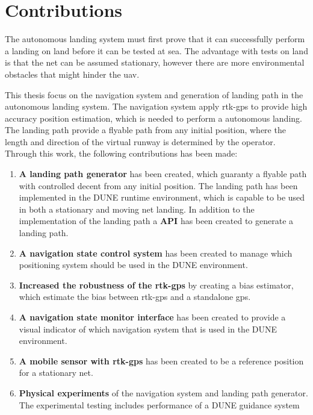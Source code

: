 \section{Contributions}
The autonomous landing system must first prove that it can successfully perform a landing on land before it can be tested at sea. The advantage with tests on land is that the net can be assumed stationary, however there are more environmental obstacles that might hinder the \gls{uav}.

This thesis focus on the navigation system and generation of landing path in the autonomous landing system. The navigation system apply \gls{rtk-gps} to provide high accuracy position estimation, which is needed to perform a autonomous landing. The landing path provide a flyable path from any initial position, where the length and direction of the virtual runway is determined by the operator. Through this work, the following contributions has been made:
\begin{enumerate}
\item \textbf{A landing path generator} has been created, which guaranty a flyable path with controlled decent from any initial position. The landing path has been implemented in the DUNE runtime environment, which is capable to be used in both a stationary and moving net landing. In addition to the implementation of the landing path a \textbf{API} has been created to generate a landing path.
\item \textbf{A navigation state control system} has been created to manage which positioning system should be used in the DUNE environment.
\item \textbf{Increased the robustness of the \gls{rtk-gps}} by creating a bias estimator, which estimate the bias between \gls{rtk-gps} and a standalone \gls{gps}.
\item \textbf{A navigation state monitor interface} has been created to provide a visual indicator of which navigation system that is used in the DUNE environment.
\item \textbf{A mobile sensor with \gls{rtk-gps}} has been created to be a reference position for a stationary net.
\item \textbf{Physical experiments} of the navigation system and landing path generator. The experimental testing includes performance of a DUNE guidance system
\end{enumerate}

